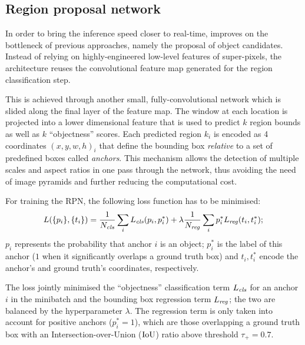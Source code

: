 
	\subsection{Region proposal network}\label{sec:frcnn_rpn}
		In order to bring the inference speed closer to real-time, \FRCNN{} improves on the bottleneck of previous approaches, namely the proposal of object candidates. Instead of relying on highly-engineered low-level features of super-pixels, the architecture reuses the convolutional feature map generated for the region classification step.

		This is achieved through another small, fully-convolutional network which is slided along the final layer of the feature map. The window at each location is projected into a lower dimensional feature that is used to predict \(k\) region bounds as well as \(k\) ``objectness'' scores. Each predicted region \(k_i\) is encoded as 4 coordinates \((x, y, w, h)_i\) that define the bounding box \emph{relative} to a set of predefined boxes called \emph{anchors}. This mechanism allows the detection of multiple scales and aspect ratios in one pass through the network, thus avoiding the need of image pyramids and further reducing the computational cost.

		For training the RPN, the following loss function has to be minimised:
		\begin{equation}\label{eq:rpn_loss}
		L(\{p_i\}, \{t_i\}) = \frac{1}{N_{\mathit{cls}}}\sum_i L_{\mathit{cls}}(p_i, p^{*}_i) + \lambda\frac{1}{N_{\mathit{reg}}}\sum_i  p^{*}_i L_{\mathit{reg}}(t_i, t^{*}_i);
		\end{equation}
		\(p_i\) represents the probability that anchor \(i\) is an object; \(p^{*}_i\) is the label of this anchor (\(1\) when it significantly overlaps a ground truth box) and \(t_i, t^{*}_i\) encode the anchor's and ground truth's coordinates, respectively.

		The loss jointly minimised  the ``objectness'' classification term \(L_{\mathit{cls}}\) for an anchor \(i\) in the minibatch and the bounding box regression term \(L_{\mathit{reg}}\); the two are balanced by the hyperparameter \(\lambda\). The regression term is only taken into account for positive anchors (\(p^{*}_i = 1\)), which are those overlapping a ground truth box with an Intersection-over-Union (\(\operatorname{IoU}\)) ratio above threshold \(\tau_+ = 0.7\).


